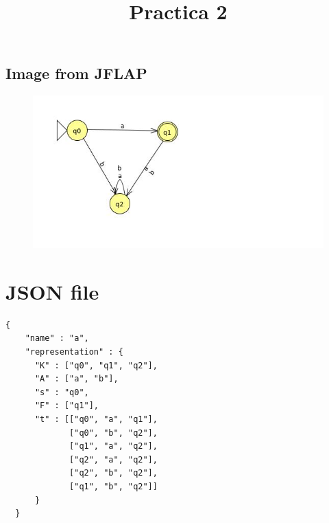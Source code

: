 \documentclass[11pt]{article}\title{\textbf{Practica 2}}
\begin{document}
\subsection{Image from JFLAP}
	\begin{figure}[htp]
	\centering
	\includegraphics[scale=0.55]{Ejercicio1.jpg}
	\end{figure}

\newpage

\section{JSON file}

\begin{verbatim}
{
    "name" : "a",
    "representation" : {
      "K" : ["q0", "q1", "q2"],
      "A" : ["a", "b"],
      "s" : "q0",
      "F" : ["q1"],
      "t" : [["q0", "a", "q1"],
             ["q0", "b", "q2"],
             ["q1", "a", "q2"],
             ["q2", "a", "q2"],
             ["q2", "b", "q2"],
             ["q1", "b", "q2"]]
      }
  }

\end{verbatim}
\end{document}
